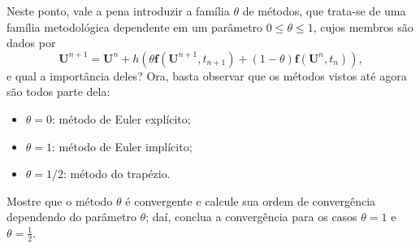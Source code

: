 \documentclass[../differential_methods.tex]{subfiles}
\begin{document}
Neste ponto, vale a pena introduzir a família \(\theta \) de métodos, que trata-se de uma família metodológica dependente em um parâmetro \(0\leq \theta \leq 1\), cujos membros são dados por
\[
	\mathbf{U}^{n+1}=\mathbf{U}^{n}+h(\theta \mathbf{f}(\mathbf{U}^{n+1}, t_{n+1}) + (1-\theta )\mathbf{f}(\mathbf{U}^{n}, t_{n})),
\]
e qual a importância deles? Ora, basta observar que os métodos vistos até agora são todos parte dela:
\begin{itemize}
	\item \(\theta =0\): método de Euler explícito;
	\item \(\theta =1\): método de Euler implícito;
	\item \(\theta =1/2\): método do trapézio.
\end{itemize}
\begin{exr}
	Mostre que o método \(\theta \) é convergente e calcule sua ordem de convergência dependendo do parâmetro \(\theta \); daí, conclua a convergência para os casos \(\theta=1\) e \(\theta = \frac{1}{2}\).
\end{exr}
\end{document}
